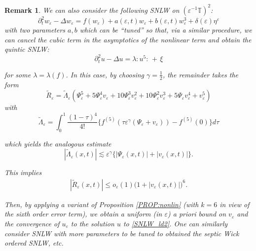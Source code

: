 \documentclass[letterpaper, 11pt,  reqno]{amsart}
\newtheorem{remark}[theorem]{Remark}
\newcommand{\1}{\hspace{0.5mm}\text{I}\hspace{0.5mm}}
\newcommand{\noi}{\noindent}
\newcommand{\T}{\mathbb{T}}
\newcommand{\Dl}{\Delta}
\newcommand{\eps}{\varepsilon}
\newcommand{\g}{\gamma}
\newcommand{\ld}{\lambda}
\newcommand{\Ld}{\Lambda}
\newcommand{\wt}{\widetilde}
\newcommand{\dt}{\partial_t}
\newcommand{\les}{\lesssim}
\numberwithin{equation}{section}
\numberwithin{theorem}{section}
\begin{document}
\begin{remark}\rm
We can also consider  the following  SNLW 
on $(\eps^{- 1} \T)^2$: 
\[ \dt^2 w_\eps- \Dl w_\eps  = f (w_\eps) + a (\eps, t) w_\eps 
+ b   (\eps, t) w_\eps^3 + \delta (\eps) \eta^\eps \]
  with two parameters $a, b$ which can be ``tuned'' 
  so that,  via a similar procedure, 
  we can cancel  the cubic term in the asymptotics of the nonlinear term 
  and obtain the  quintic SNLW: 
    \begin{equation}
\dt^2 u - \Dl  u = \lambda : \!u^5 \!: \, + \, \xi
    \label{SNLW_ld2}
  \end{equation}

\noi
for some $\ld = \ld(f)$.
  In this case, by choosing $\g = \frac 12$, 
    the remainder  takes the  form
  \[ \wt{R}_{\eps} = \wt{\Lambda}_{\eps} 
     (\Psi_{\eps}^5 + 5 \Psi_{\eps}^4 v_{\eps} + 10
     \Psi_{\eps}^3 v_{\eps}^2 + 10 \Psi_{\eps}^2
     v_{\eps}^3 + 5 \Psi_{\eps} v_{\eps}^4 +
     v_{\eps}^5) \]
  with
  \[ \wt{\Lambda}_{\eps} = \int_0^1 \frac{(1 - \tau)^4}{4!} 
     \big\{f^{(5)} (\tau \eps^{\gamma} (\Psi_{\eps} +
     v_{\eps})) - f^{(5)} (0)\big\} d \tau \]


\noi
  which yields the analogous estimate
  \[| \wt \Ld_\eps (x, t) | \les \eps^{\gamma} 
\big\{|    \Psi_{\eps} (x, t) | + | v_{\eps} (x, t) |\big\} .   \]
 
 \noi
 This implies
\begin{align*} | \wt R_{\eps} (x, t ) | \leq o_{\eps} (1) \big(1 + |   v_{\eps} (x, t) |\big)^6 . 
\end{align*}


 
 \noi
 Then, by applying 
 a variant of Proposition \ref{PROP:nonlin} 
(with $k = 6$ in view of the sixth order error term), 
 we obtain a uniform (in $\eps$) a priori bound on $v_\eps$
 and the convergence of $u_\eps$ to the solution $u$
 to \eqref{SNLW_ld2}.
 One can similarly consider SNLW with more parameters to be tuned
 to obtained the septic Wick ordered SNLW, etc.
 

\end{remark}
\end{document}
